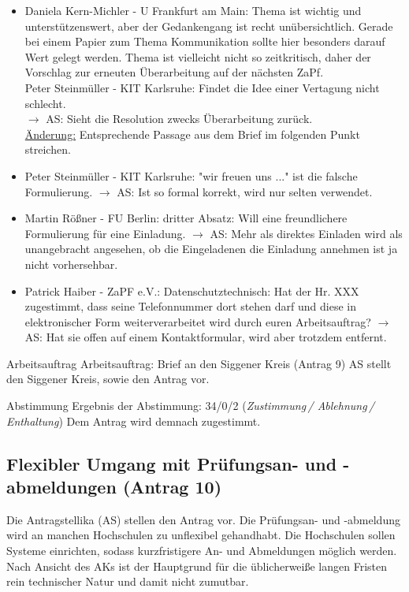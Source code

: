     \begin{itemize}
      \item Daniela Kern-Michler - U Frankfurt am Main: Thema ist wichtig und unterstützenswert, aber der Gedankengang ist recht unübersichtlich. Gerade bei einem Papier zum Thema Kommunikation sollte hier besonders darauf Wert gelegt werden. Thema ist vielleicht nicht so zeitkritisch, daher der  Vorschlag zur erneuten Überarbeitung auf der nächsten ZaPf. \\
      Peter Steinmüller - KIT Karlsruhe: Findet die Idee einer Vertagung nicht schlecht. \\
      $\rightarrow$ AS: Sieht die Resolution zwecks Überarbeitung zurück. \\
      \uline{Änderung:} Entsprechende Passage aus dem Brief im folgenden Punkt streichen.
      \item Peter Steinmüller - KIT Karlsruhe: "wir freuen uns ..." ist die falsche Formulierung. $\rightarrow$ AS: Ist so formal korrekt, wird nur selten verwendet.
      \item Martin Rößner - FU Berlin: dritter Absatz: Will eine freundlichere Formulierung für eine Einladung. $\rightarrow$ AS: Mehr als direktes Einladen wird als unangebracht angesehen, ob die Eingeladenen die Einladung annehmen ist ja nicht vorhersehbar.
      \item Patrick Haiber - ZaPF e.V.: Datenschutztechnisch: Hat der Hr. XXX zugestimmt, dass seine Telefonnummer dort stehen darf und diese in elektronischer Form weiterverarbeitet wird durch euren Arbeitsauftrag? $\rightarrow$ AS: Hat sie offen auf einem Kontaktformular, wird aber trotzdem entfernt.
    \end{itemize}

    \begin{info}{Arbeitsauftrag}
      Arbeitsauftrag: Brief an den Siggener Kreis (Antrag 9)
      AS stellt den Siggener Kreis, sowie den Antrag vor.
    \end{info}

    \begin{success}{Abstimmung}
      Ergebnis der Abstimmung: 34/0/2 (\textit{Zustimmung\,/ Ablehnung\,/ Enthaltung})
      Dem Antrag wird demnach zugestimmt.
    \end{success}

  \subsection*{Flexibler Umgang mit Prüfungsan- und -abmeldungen (Antrag 10)}
    Die Antragstellika (AS) stellen den Antrag vor.
    Die Prüfungsan- und -abmeldung wird an manchen Hochschulen zu unflexibel gehandhabt. Die Hochschulen sollen Systeme einrichten, sodass kurzfristigere An- und Abmeldungen möglich werden.
    Nach Ansicht des AKs ist der Hauptgrund für die üblicherweiße langen Fristen rein technischer Natur und damit nicht zumutbar.

